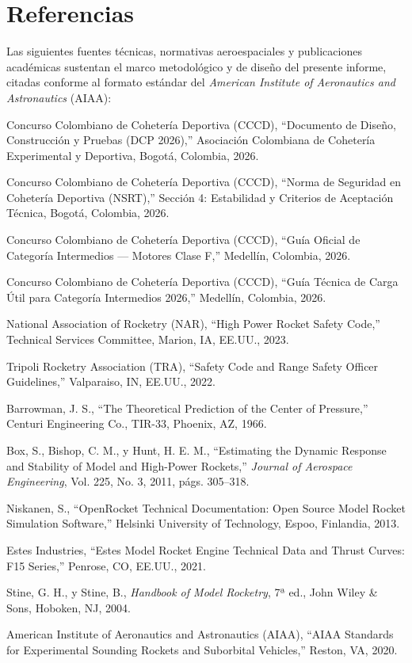 \section{Referencias}

Las siguientes fuentes técnicas, normativas aeroespaciales y publicaciones académicas sustentan el marco metodológico y de diseño del presente informe, citadas conforme al formato estándar del \textit{American Institute of Aeronautics and Astronautics} (AIAA):

\begin{enumerate}[label={[\arabic*]}, leftmargin=2em]
    \item Concurso Colombiano de Cohetería Deportiva (CCCD), ``Documento de Diseño, Construcción y Pruebas (DCP 2026),'' Asociación Colombiana de Cohetería Experimental y Deportiva, Bogotá, Colombia, 2026.
    \item Concurso Colombiano de Cohetería Deportiva (CCCD), ``Norma de Seguridad en Cohetería Deportiva (NSRT),'' Sección 4: Estabilidad y Criterios de Aceptación Técnica, Bogotá, Colombia, 2026.
    \item Concurso Colombiano de Cohetería Deportiva (CCCD), ``Guía Oficial de Categoría Intermedios --- Motores Clase F,'' Medellín, Colombia, 2026.
    \item Concurso Colombiano de Cohetería Deportiva (CCCD), ``Guía Técnica de Carga Útil para Categoría Intermedios 2026,'' Medellín, Colombia, 2026.
    \item National Association of Rocketry (NAR), ``High Power Rocket Safety Code,'' Technical Services Committee, Marion, IA, EE.UU., 2023.
    \item Tripoli Rocketry Association (TRA), ``Safety Code and Range Safety Officer Guidelines,'' Valparaiso, IN, EE.UU., 2022.
    \item Barrowman, J. S., ``The Theoretical Prediction of the Center of Pressure,'' Centuri Engineering Co., TIR-33, Phoenix, AZ, 1966.
    \item Box, S., Bishop, C. M., y Hunt, H. E. M., ``Estimating the Dynamic Response and Stability of Model and High-Power Rockets,'' \textit{Journal of Aerospace Engineering}, Vol. 225, No. 3, 2011, págs. 305--318.
    \item Niskanen, S., ``OpenRocket Technical Documentation: Open Source Model Rocket Simulation Software,'' Helsinki University of Technology, Espoo, Finlandia, 2013.
    \item Estes Industries, ``Estes Model Rocket Engine Technical Data and Thrust Curves: F15 Series,'' Penrose, CO, EE.UU., 2021.
    \item Stine, G. H., y Stine, B., \textit{Handbook of Model Rocketry}, 7ª ed., John Wiley \& Sons, Hoboken, NJ, 2004.
    \item American Institute of Aeronautics and Astronautics (AIAA), ``AIAA Standards for Experimental Sounding Rockets and Suborbital Vehicles,'' Reston, VA, 2020.
\end{enumerate}
